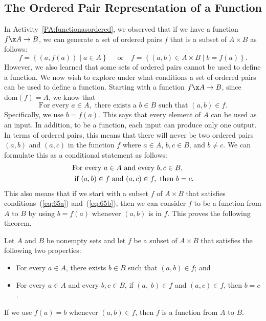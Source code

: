 \setcounter{equation}{0}
\subsection*{The Ordered Pair Representation of a Function}
%
In \typeu Activity~\ref*{PA:functionasordered}, we observed that if we have a function  
$f\x A \to B$, we can generate a set of ordered pairs $f$  that is a subset of  $A \times B$ as follows:
\[
  f = \left\{ { {\left( {a, f( a )} \right)} \mid a \in A} \right\} \quad \text{ or}  
  \quad f = \left\{ {( {a, b} ) \in A \times B \mid b = f( a )} \right\}\!.  
\]
However, we also learned that some sets of ordered pairs cannot be used to define a function.  We now wish to explore under what conditions a set of ordered pairs can be used to define a function.
  Starting with a function $f\x  A \to B$, since  $\text{dom}( f ) = A$, we know that
%
\begin{equation} \label{eq:65a}
\text{For every }  a \in A, \text{ there exists a }  b \in B  \text{ such that }  
( {a, b} ) \in f.
\end{equation}
%
Specifically, we use  $b = f( a )$.  This says that every element of  $A$  can be used as an input.  In addition, to be a function, each input can produce only one output.  In terms of ordered pairs, this means that there will never be two ordered pairs   
$( {a, b} )$  and  $( {a, c} )$  in the function  $f$  where  
$a \in A$, $b, c \in B$, and  $b \ne c$.  We can formulate this as a conditional statement as follows:
\begin{align} 
&\text{For every } a \in A \text{ and every } b, c \in B,  \notag \\
&\text{ if } ( {a, b} ) \in f  \text{ and } ( {a, c} ) \in f, 
\text{ then } b = c. \label{eq:65b}
\end{align}
%
This also means that if we start with a subset  $f$  of  $A \times B$  that satisfies  conditions~(\ref{eq:65a})  and~(\ref{eq:65b}), then we can consider  $f$  to be a function  from  $A$  to  $B$  by using  \linebreak
$b = f( a )$  whenever $( {a, b} )$  is in  $f$.  This proves the following theorem.
\enlargethispage{\baselineskip}
%
\begin{theorem} \label{T:functionasordered}
Let  $A$  and  $B$  be nonempty sets and let $f$ be a subset of $A \times B$ that satisfies the following two properties:

\begin{itemize}
\item For every  $a \in A$, there exists  $b \in B$  such that  
$( {a, b} ) \in f$\!; and

\item For every  $a \in A$ and every  $b, c \in B$, if  $( {a,\;b} ) \in f$  and  $( {a, c} ) \in f$, then  $b = c$.
\end{itemize}
If we use  $f( a ) = b$ whenever  $( {a, b} ) \in f$, then  $f$  is a function from  $A$  to  $B$.
\end{theorem}
